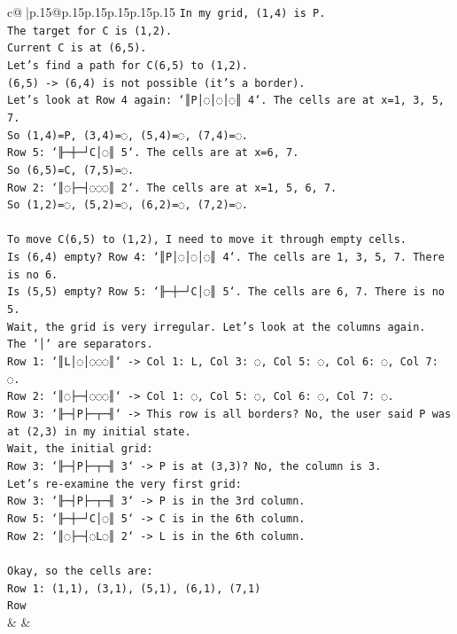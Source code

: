 \documentclass{article}
\begin{document}
{\begin{supertabular}{c@{$\;$}|p{.15\linewidth}@{}p{.15\linewidth}p{.15\linewidth}p{.15\linewidth}p{.15\linewidth}p{.15\linewidth}}
{{{\texttt{In my grid, (1,4) is P.} \\
\texttt{The target for C is (1,2).} \\
\texttt{Current C is at (6,5).} \\
\texttt{Let's find a path for C(6,5) to (1,2).} \\
\texttt{(6,5) {-}> (6,4) is not possible (it's a border).} \\
\texttt{Let's look at Row 4 again: `║P│◌│◌│◌║ 4`. The cells are at x=1, 3, 5, 7.} \\
\texttt{So (1,4)=P, (3,4)=◌, (5,4)=◌, (7,4)=◌.} \\
\texttt{Row 5: `╟─┼─┘C│◌║ 5`. The cells are at x=6, 7.} \\
\texttt{So (6,5)=C, (7,5)=◌.} \\
\texttt{Row 2: `║◌├─┤◌◌◌║ 2`. The cells are at x=1, 5, 6, 7.} \\
\texttt{So (1,2)=◌, (5,2)=◌, (6,2)=◌, (7,2)=◌.} \\
\\ 
\texttt{To move C(6,5) to (1,2), I need to move it through empty cells.} \\
\texttt{Is (6,4) empty? Row 4: `║P│◌│◌│◌║ 4`. The cells are 1, 3, 5, 7. There is no 6.} \\
\texttt{Is (5,5) empty? Row 5: `╟─┼─┘C│◌║ 5`. The cells are 6, 7. There is no 5.} \\
\texttt{Wait, the grid is very irregular. Let's look at the columns again.} \\
\texttt{The `│` are separators.} \\
\texttt{Row 1: `║L│◌│◌◌◌║` {-}> Col 1: L, Col 3: ◌, Col 5: ◌, Col 6: ◌, Col 7: ◌.} \\
\texttt{Row 2: `║◌├─┤◌◌◌║` {-}> Col 1: ◌, Col 5: ◌, Col 6: ◌, Col 7: ◌.} \\
\texttt{Row 3: `╟─┤P├─┬─╢` {-}> This row is all borders? No, the user said P was at (2,3) in my initial state.} \\
\texttt{Wait, the initial grid:} \\
\texttt{Row 3: `╟─┤P├─┬─╢ 3` {-}> P is at (3,3)? No, the column is 3.} \\
\texttt{Let's re{-}examine the very first grid:} \\
\texttt{Row 3: `╟─┤P├─┬─╢ 3` {-}> P is in the 3rd column.} \\
\texttt{Row 5: `╟─┼─┘C│◌║ 5` {-}> C is in the 6th column.} \\
\texttt{Row 2: `║◌├─┤◌L◌║ 2` {-}> L is in the 6th column.} \\
\\ 
\texttt{Okay, so the cells are:} \\
\texttt{Row 1: (1,1), (3,1), (5,1), (6,1), (7,1)} \\
\texttt{Row} \\
            }
        }
    }
    & & \\ \\


\end{supertabular}}
\end{document}
